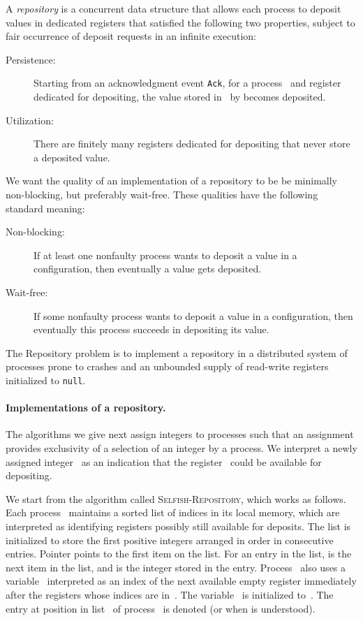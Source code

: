 \documentclass[11pt]{article}
\newcommand{\BBB}{\vspace*{-\bigskipamount}}
\newcommand{\Paragraph}[1]{\BBB\paragraph{#1}}
\begin{document}
A \emph{repository} is a concurrent data structure that allows each process to deposit  values in dedicated registers that satisfied the following two properties, subject to fair occurrence  of deposit requests  in an infinite execution:
\begin{description}
\item[\sf Persistence:]  
Starting from an acknowledgment event  \texttt{Ack}, for a process~ and register  dedicated for depositing, the value stored in~ by  becomes deposited. 
\item[\sf Utilization:] 
There are finitely many registers dedicated for depositing that never store a deposited value.
\end{description}

We want the quality of an implementation of a repository to be be minimally non-blocking, but preferably wait-free.
These qualities have the following standard meaning:
\begin{description}
\item[\sf Non-blocking:] 
If at least one nonfaulty process wants to deposit a value in a configuration, then eventually a value gets deposited.
\item[\sf Wait-free:] 
If some nonfaulty process wants to deposit a value in a configuration, then eventually this process succeeds in depositing its value.
\end{description}
The Repository problem is to implement a repository in a distributed system of  processes prone to crashes and an unbounded supply of read-write registers initialized to \texttt{null}.





\Paragraph{Implementations of a repository.} 




The algorithms we give next assign integers to processes such that an assignment provides exclusivity of a selection of an integer by a process.
We interpret a newly assigned integer~ as an indication that the register~ could be  available for depositing.

We start from the algorithm called \textsc{Selfish-Repository}, which works as follows.
Each process~ maintains a sorted list  of  indices  in its local memory, which are interpreted as identifying registers possibly still available for deposits.
The list is initialized to store the first  positive integers arranged in order in consecutive entries.
Pointer  points to the first item on the list.
For an entry  in the list,  is the next item in the list, and  is the integer stored in the entry.
Process~ also  uses a variable~ interpreted as an index of the next available empty register immediately after the registers whose indices are in~.
The variable~ is initialized to~.
The entry at position  in list~ of process~ is denoted  (or  when  is understood).
\end{document}

